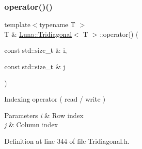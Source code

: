 \mbox{\label{classLuna_1_1Tridiagonal_ae5bbfe810d68ead053a4178d742c58ea}} 
\subsubsection{\texorpdfstring{operator()()}{operator()()}\hspace{0.1cm}{\footnotesize\ttfamily [2/2]}}
{\footnotesize\ttfamily template$<$typename T $>$ \\
T \& \hyperlink{classLuna_1_1Tridiagonal}{Luna\+::\+Tridiagonal}$<$ T $>$\+::operator() (\begin{DoxyParamCaption}\item[{const std\+::size\+\_\+t \&}]{i,  }\item[{const std\+::size\+\_\+t \&}]{j }\end{DoxyParamCaption})\hspace{0.3cm}{\ttfamily [inline]}}



Indexing operator ( read / write ) 


\begin{DoxyParams}{Parameters}
{\em i} & Row index \\
\hline
{\em j} & Column index \\
\hline
\end{DoxyParams}


Definition at line 344 of file Tridiagonal.\+h.


